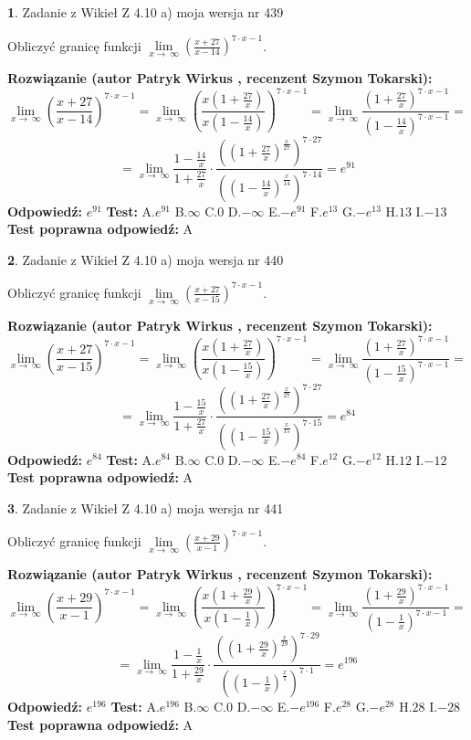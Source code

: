 \documentclass[12pt, a4paper]{article}
\theoremstyle{definition} %
\newtheorem{zad}{}
\newcommand{\zadStart}[1]{\begin{zad}#1\newline}
\newcommand{\zadStop}{\end{zad}}
\newcommand{\rozwStart}[2]{\noindent \textbf{Rozwiązanie (autor #1 , recenzent #2): }\newline}
\newcommand{\rozwStop}{\newline}
\newcommand{\odpStart}{\noindent \textbf{Odpowiedź:}\newline}
\newcommand{\odpStop}{\newline}
\newcommand{\testStart}{\noindent \textbf{Test:}\newline}
\newcommand{\testStop}{\newline}
\newcommand{\kluczStart}{\noindent \textbf{Test poprawna odpowiedź:}\newline}
\newcommand{\kluczStop}{\newline}
\begin{document}
\zadStart{Zadanie z Wikieł Z 4.10 a) moja wersja nr 439}

Obliczyć granicę funkcji  $\lim\limits_{x\to\ \infty}(\frac{x+27}{x-14})^{7\cdot x-1}$.
\zadStop
\rozwStart{Patryk Wirkus}{Szymon Tokarski}
$$\lim\limits_{x\to\ \infty}(\frac{x+27}{x-14})^{7\cdot x-1} = \lim\limits_{x\to\ \infty}(\frac{x(1+\frac{27}{x})}{x(1-\frac{14}{x})})^{7\cdot x-1}=\lim\limits_{x\to\ \infty}\frac{(1+\frac{27}{x})^{7\cdot x-1}}{(1-\frac{14}{x})^{7\cdot x-1}}=$$
$$=\lim\limits_{x\to\ \infty}\frac{1-\frac{14}{x}}{1+\frac{27}{x}}\cdot\frac{((1+\frac{27}{x})^{\frac{x}{27}})^{7\cdot27}}{((1-\frac{14}{x})^{\frac{x}{14}})^{7\cdot14}}=e^{91}$$
\rozwStop
\odpStart
$e^{91}$
\odpStop
\testStart
A.$e^{91}$ B.$\infty$ C.$0$ D.$-\infty$ E.$-e^{91}$
F.$e^{13}$ G.$-e^{13}$
H.$13$
I.$-13$
\testStop
\kluczStart
A
\kluczStop



\zadStart{Zadanie z Wikieł Z 4.10 a) moja wersja nr 440}

Obliczyć granicę funkcji  $\lim\limits_{x\to\ \infty}(\frac{x+27}{x-15})^{7\cdot x-1}$.
\zadStop
\rozwStart{Patryk Wirkus}{Szymon Tokarski}
$$\lim\limits_{x\to\ \infty}(\frac{x+27}{x-15})^{7\cdot x-1} = \lim\limits_{x\to\ \infty}(\frac{x(1+\frac{27}{x})}{x(1-\frac{15}{x})})^{7\cdot x-1}=\lim\limits_{x\to\ \infty}\frac{(1+\frac{27}{x})^{7\cdot x-1}}{(1-\frac{15}{x})^{7\cdot x-1}}=$$
$$=\lim\limits_{x\to\ \infty}\frac{1-\frac{15}{x}}{1+\frac{27}{x}}\cdot\frac{((1+\frac{27}{x})^{\frac{x}{27}})^{7\cdot27}}{((1-\frac{15}{x})^{\frac{x}{15}})^{7\cdot15}}=e^{84}$$
\rozwStop
\odpStart
$e^{84}$
\odpStop
\testStart
A.$e^{84}$ B.$\infty$ C.$0$ D.$-\infty$ E.$-e^{84}$
F.$e^{12}$ G.$-e^{12}$
H.$12$
I.$-12$
\testStop
\kluczStart
A
\kluczStop



\zadStart{Zadanie z Wikieł Z 4.10 a) moja wersja nr 441}

Obliczyć granicę funkcji  $\lim\limits_{x\to\ \infty}(\frac{x+29}{x-1})^{7\cdot x-1}$.
\zadStop
\rozwStart{Patryk Wirkus}{Szymon Tokarski}
$$\lim\limits_{x\to\ \infty}(\frac{x+29}{x-1})^{7\cdot x-1} = \lim\limits_{x\to\ \infty}(\frac{x(1+\frac{29}{x})}{x(1-\frac{1}{x})})^{7\cdot x-1}=\lim\limits_{x\to\ \infty}\frac{(1+\frac{29}{x})^{7\cdot x-1}}{(1-\frac{1}{x})^{7\cdot x-1}}=$$
$$=\lim\limits_{x\to\ \infty}\frac{1-\frac{1}{x}}{1+\frac{29}{x}}\cdot\frac{((1+\frac{29}{x})^{\frac{x}{29}})^{7\cdot29}}{((1-\frac{1}{x})^{\frac{x}{1}})^{7\cdot1}}=e^{196}$$
\rozwStop
\odpStart
$e^{196}$
\odpStop
\testStart
A.$e^{196}$ B.$\infty$ C.$0$ D.$-\infty$ E.$-e^{196}$
F.$e^{28}$ G.$-e^{28}$
H.$28$
I.$-28$
\testStop
\kluczStart
A
\kluczStop
\end{document}
